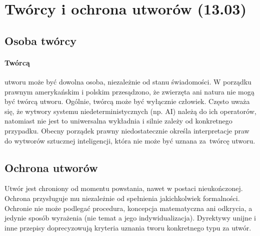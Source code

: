 \documentclass{article}
\begin{document}
\section{Twórcy i ochrona utworów (13.03)}

\subsection{Osoba twórcy}

\paragraph{Twórcą}
utworu może być dowolna osoba, niezależnie od stanu świadomości.
W porządku prawnym amerykańskim i polskim przesądzono, że zwierzęta ani natura nie mogą być twórcą utworu.
Ogólnie, twórcą może być wyłącznie człowiek.
Często uważa się, że wytwory systemu niedeterministycznych (np. AI) należą do ich operatorów,
natomiast nie jest to uniwersalna wykładnia i silnie zależy od konkretnego przypadku.
Obecny porządek prawny niedostatecznie określa interpretacje praw do wytworów sztucznej inteligencji,
która nie może być uznana za~twórcę utworu.

\subsection{Ochrona utworów}

Utwór jest chroniony od momentu powstania, nawet w postaci nieukończonej.
Ochrona przysługuje mu niezależnie od spełnienia jakichkolwiek formalności.
Ochronie nie może podlegać procedura, koncepcja matematyczna ani odkrycia,
a jedynie sposób wyrażenia (nie temat a jego indywidualizacja).
Dyrektywy unijne i inne przepisy doprecyzowują kryteria uznania tworu konkretnego typu za utwór.
\end{document}
